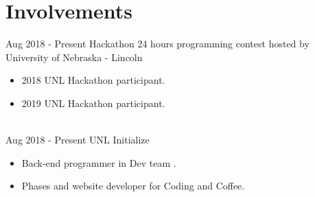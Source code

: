 \documentclass[letterpaper]{twentysecondcv} %
\begin{document}
\section{Involvements}
\begin{twenty}
	
    \twentyitem
    	{Aug 2018 - }
		{Present}
        {Hackathon}
        {}
        {24 hours programming contest hosted by University of Nebraska - Lincoln}
        {
        {\begin{itemize}
        \item 2018 UNL Hackathon participant.
        \item 2019 UNL Hackathon participant.
		\end{itemize}}
        }
    \\
    \twentyitem
    	{Aug 2018 -}
		{Present}
        {UNL Initialize}
        {}
        {}
        {
        {\begin{itemize}
        \item Back-end programmer in Dev team .
        \item Phases and website developer for Coding and Coffee.
		\end{itemize}}
        }
\end{twenty}
\end{document}
